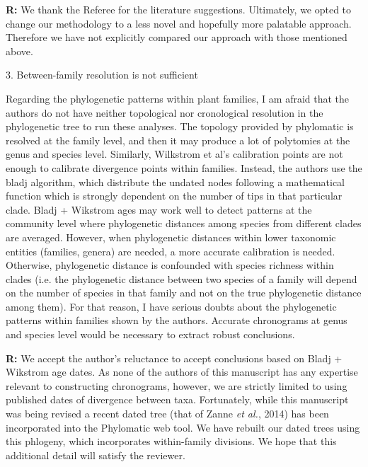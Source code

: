 \documentclass[12pt]{letter}
\newenvironment{refquote}{\bigskip \begin{it}}{\end{it}\smallskip}
\begin{document}
    \textbf{R:} We thank the Referee for the literature suggestions. Ultimately, we opted to change our methodology to a less novel and hopefully more palatable approach. Therefore we have not explicitly compared our approach with those mentioned above.



  3. Between-family resolution is not sufficient

    \begin{refquote}

      Regarding the phylogenetic patterns within plant families, I am afraid that the authors do not have neither topological nor cronological resolution in the phylogenetic tree to run these analyses. The topology provided by phylomatic is resolved at the family level, and then it may produce a lot of polytomies at the genus and species level. Similarly, Wilkstrom et al's calibration points are not enough to calibrate divergence points within families. Instead, the authors use the bladj algorithm, which distribute the undated nodes following a mathematical function which is strongly dependent on the number of tips in that particular clade.  Bladj + Wikstrom ages may work well to detect patterns at the community level where phylogenetic distances among species from different clades are averaged.  However, when phylogenetic distances within lower taxonomic entities (families, genera) are needed, a more accurate calibration is needed. Otherwise, phylogenetic distance is confounded with species richness within clades (i.e. the phylogenetic distance between two species of a family will depend on the  number of species in that family and not on the true phylogenetic distance among them). For that reason, I have serious doubts about the phylogenetic patterns within families shown by the authors. Accurate chronograms at genus and species level would be necessary to extract robust conclusions.

      \end{refquote}

      \textbf{R:} We accept the author's reluctance to accept conclusions based on Bladj + Wikstrom age dates. As none of the authors of this manuscript has any expertise relevant to constructing chronograms, however, we are strictly limited to using published dates of divergence between taxa. Fortunately, while this manuscript was being revised a recent dated tree (that of Zanne \emph{et al.}, 2014) has been incorporated into the Phylomatic web tool. We have rebuilt our dated trees using this phlogeny, which incorporates within-family divisions. We hope that this additional detail will satisfy the reviewer.
\end{document}
